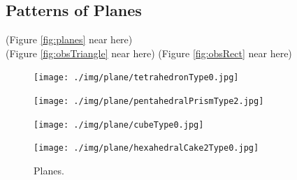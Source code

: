 \documentclass[suppldata, dvipdfmx]{interact}
\theoremstyle{plain}%
\theoremstyle{definition}
\theoremstyle{remark}
\theoremstyle{problemstyle}
\begin{document}
 

\subsection{Patterns of Planes}\label{section:patternsOfPlanes}

\noindent(Figure \ref{fig:planes}
 near here)\\
(Figure \ref{fig:obsTriangle} near here)
(Figure \ref{fig:obsRect} near here)

\begin{figure}[h!tbp]
  \begin{minipage}[t]{0.23\textwidth}
   \centering
   \texttt{[image: ./img/plane/tetrahedronType0.jpg]}
   \label{fig:planeTetra}
  \end{minipage}
 \hspace*{\fill}
  \begin{minipage}[t]{0.23\textwidth}
   \centering
   \texttt{[image: ./img/plane/pentahedralPrismType2.jpg]}
   \label{fig:planePentaPrism}
  \end{minipage}
 \caption{Planes.}
 \label{fig:planes}
 \hspace*{\fill}
  \begin{minipage}[t]{0.23\textwidth}
   \centering
   \texttt{[image: ./img/plane/cubeType0.jpg]}
   \label{fig:planeCube}
  \end{minipage}
  \hspace*{\fill}
  \begin{minipage}[t]{0.23\textwidth}
   \centering
   \texttt{[image: ./img/plane/hexahedralCake2Type0.jpg]}
   \label{fig:planeCake}
  \end{minipage}
 \hspace*{\fill}
\end{figure}
\end{document}
